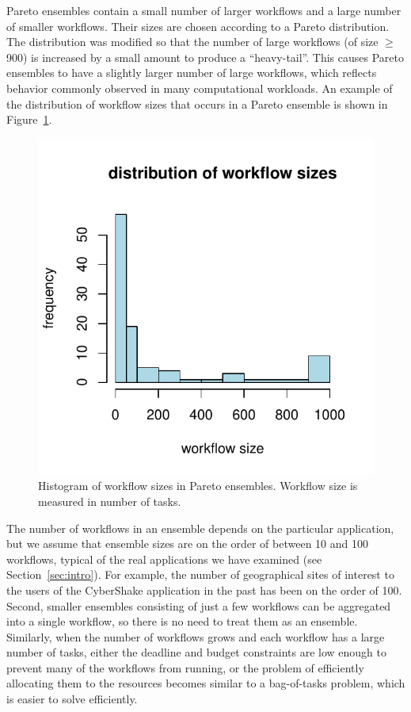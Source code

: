 \documentclass[preprint,5p]{elsarticle}
\begin{document}
Pareto ensembles contain a small number of larger workflows and a large number
of smaller workflows. Their sizes  
are chosen according to a Pareto distribution. The distribution was modified so
that the number of large workflows (of size $\geq$ 900) is increased by a small amount to
produce a ``heavy-tail''. This causes Pareto ensembles to have a slightly larger
number of large workflows, which reflects behavior commonly observed in many
computational workloads. 
An example of the distribution of workflow sizes that
occurs in a Pareto ensemble is shown in Figure~\ref{fig:ensemble-pareto}.

\begin{figure}[t] 
    \centering
    \includegraphics[width=0.6\columnwidth]{figures/ensemble-pareto}
    \caption[Histogram of workflow sizes in Pareto ensembles]{Histogram of
    workflow sizes in Pareto ensembles. Workflow size is measured in number of
    tasks.}
    \label{fig:ensemble-pareto}
\end{figure}

The number of workflows in an ensemble depends on the particular application,
but we assume that ensemble sizes are on the order of between 10 and 100
workflows, typical of the real applications we have examined (see Section~\ref{sec:intro}). 
For example, the number of
geographical sites of interest to the users of the CyberShake application in
the past has been on the order of 100. 
Second, smaller ensembles consisting of
just a few workflows can be aggregated into a single workflow, so there is no need to
treat them as an ensemble. Similarly, when the number of workflows grows and
each workflow has a large number of tasks, either the deadline and budget
constraints are low enough to prevent many of the workflows from running, or the
problem of efficiently allocating them to the resources becomes similar to a
bag-of-tasks problem, which is easier to solve efficiently.
\end{document}
